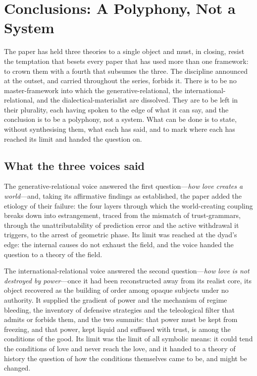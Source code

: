 \section{Conclusions: A Polyphony, Not a System}
\label{p17:sec:conclusions}

\noindent
The paper has held three theories to a single object and must, in closing, resist the temptation that besets every paper that has used more than one framework: to crown them with a fourth that subsumes the three. The discipline announced at the outset, and carried throughout the series, forbids it. There is to be no master-framework into which the generative-relational, the international-relational, and the dialectical-materialist are dissolved. They are to be left in their plurality, each having spoken to the edge of what it can say, and the conclusion is to be a polyphony, not a system. What can be done is to state, without synthesising them, what each has said, and to mark where each has reached its limit and handed the question on.

\subsection{What the three voices said}
\label{p17:sub:concl-three}

The generative-relational voice answered the first question---\emph{how love creates a world}---and, taking its affirmative findings as established, the paper added the etiology of their failure: the four layers through which the world-creating coupling breaks down into estrangement, traced from the mismatch of trust-grammars, through the unattributability of prediction error and the active withdrawal it triggers, to the arrest of geometric phase. Its limit was reached at the dyad's edge: the internal causes do not exhaust the field, and the voice handed the question to a theory of the field.

The international-relational voice answered the second question---\emph{how love is not destroyed by power}---once it had been reconstructed away from its realist core, its object recovered as the building of order among opaque subjects under no authority. It supplied the gradient of power and the mechanism of regime bleeding, the inventory of defensive strategies and the teleological filter that admits or forbids them, and the two summits: that power must be kept from freezing, and that power, kept liquid and suffused with trust, is among the conditions of the good. Its limit was the limit of all symbolic means: it could tend the conditions of love and never reach the love, and it handed to a theory of history the question of how the conditions themselves came to be, and might be changed.

